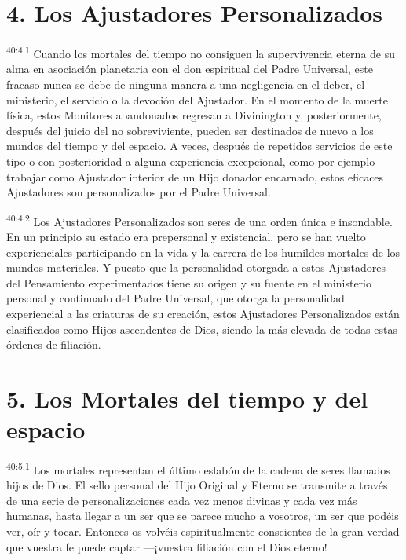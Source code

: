 \section*{4. Los Ajustadores Personalizados}
\par
\textsuperscript{40:4.1} Cuando los mortales del tiempo no consiguen la supervivencia eterna de su alma en asociación planetaria con el don espiritual del Padre Universal, este fracaso nunca se debe de ninguna manera a una negligencia en el deber, el ministerio, el servicio o la devoción del Ajustador. En el momento de la muerte física, estos Monitores abandonados regresan a Divinington y, posteriormente, después del juicio del no sobreviviente, pueden ser destinados de nuevo a los mundos del tiempo y del espacio. A veces, después de repetidos servicios de este tipo o con posterioridad a alguna experiencia excepcional, como por ejemplo trabajar como Ajustador interior de un Hijo donador encarnado, estos eficaces Ajustadores son personalizados por el Padre Universal.

\par
\textsuperscript{40:4.2} Los Ajustadores Personalizados son seres de una orden única e insondable. En un principio su estado era prepersonal y existencial, pero se han vuelto experienciales participando en la vida y la carrera de los humildes mortales de los mundos materiales. Y puesto que la personalidad otorgada a estos Ajustadores del Pensamiento experimentados tiene su origen y su fuente en el ministerio personal y continuado del Padre Universal, que otorga la personalidad experiencial a las criaturas de su creación, estos Ajustadores Personalizados están clasificados como Hijos ascendentes de Dios, siendo la más elevada de todas estas órdenes de filiación.

\section*{5. Los Mortales del tiempo y del espacio}
\par
\textsuperscript{40:5.1} Los mortales representan el último eslabón de la cadena de seres llamados hijos de Dios. El sello personal del Hijo Original y Eterno se transmite a través de una serie de personalizaciones cada vez menos divinas y cada vez más humanas, hasta llegar a un ser que se parece mucho a vosotros, un ser que podéis ver, oír y tocar. Entonces os volvéis espiritualmente conscientes de la gran verdad que vuestra fe puede captar ---¡vuestra filiación con el Dios eterno!


